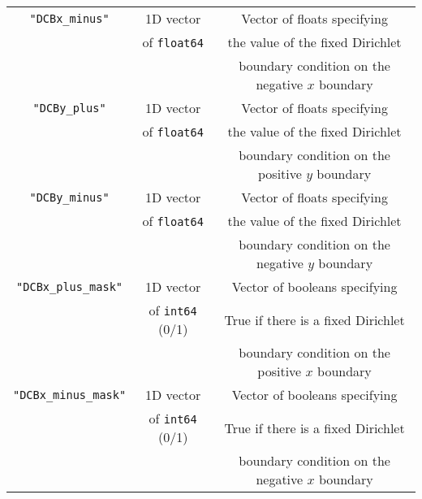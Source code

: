 \documentclass[11pt]{article}
\begin{document}
\begin{table}
\begin{tabular}{c | c | c}
            \hline
            \texttt{"DCBx\_minus"} & 1D vector & Vector of floats specifying \\
            & of \texttt{float64} & the value of the fixed Dirichlet \\
            & & boundary condition on the negative \(x\) boundary \\
            \hline
            \texttt{"DCBy\_plus"} & 1D vector & Vector of floats specifying \\
            & of \texttt{float64} & the value of the fixed Dirichlet \\
            & & boundary condition on the positive \(y\) boundary \\
            \hline
            \texttt{"DCBy\_minus"} & 1D vector & Vector of floats specifying \\
            & of \texttt{float64} & the value of the fixed Dirichlet \\
            & & boundary condition on the negative \(y\) boundary \\
            \hline
            \texttt{"DCBx\_plus\_mask"} & 1D vector & Vector of booleans specifying \\
            & of \texttt{int64} (0/1) & True if there is a fixed Dirichlet \\
            & & boundary condition on the positive \(x\) boundary \\
            \hline
            \texttt{"DCBx\_minus\_mask"} & 1D vector & Vector of booleans specifying \\
            & of \texttt{int64} (0/1) & True if there is a fixed Dirichlet \\
            & & boundary condition on the negative \(x\) boundary \\

        \end{tabular}
    \end{table}
\end{document}
